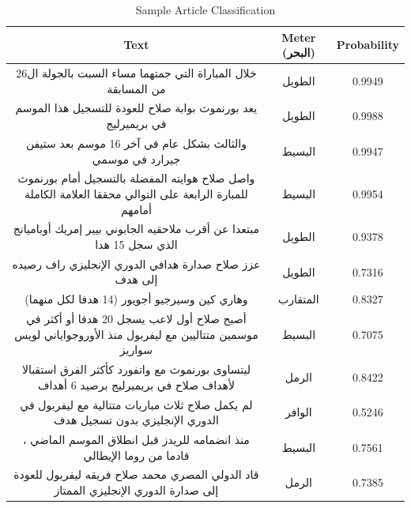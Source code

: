   \begin{table}[!t]
    \centering
    \begin{tabular*}{\textwidth}{c @{\extracolsep{\fill}}c c}
      \toprule
      \textbf{\small{Text}} & \small{\textbf{Meter (\textarabic{البحر})}} & \small{\textbf{Probability}} \\
      \midrule
            \textarabic{خلال المباراة التي جمتهما مساء السبت بالجولة ال26 من المسابقة} & \textarabic{الطويل} & 0.9949\\

      \textarabic{يعد بورنموث بوابة صلاح للعودة للتسجيل هذا الموسم في بريميرليج} & \textarabic{الطويل} & 0.9988\\
      
      \textarabic{والثالث بشكل عام في آخر 16 موسم بعد ستيفن جيرارد في موسمي} & \textarabic{البسيط} & 0.9947\\
      \textarabic{واصل صلاح هوايته المفضلة بالتسجيل أمام بورنموث للمبارة الرابعة على التوالي محققا العلامة الكاملة أمامهم} & \textarabic{البسيط} & 0.9954\\
            \textarabic{مبتعدا عن أقرب ملاحقيه الجابوني بيير إمريك أوباميانج الذي سجل 15 هدا} & \textarabic{الطويل} & 0.9378\\

      \textarabic{عزز صلاح صدارة هدافي الدوري الإنجليزي راف رصيده إلى  هدف} & \textarabic{الطويل} & 0.7316\\
      \textarabic{وهاري كين وسيرجيو أجويور (14 هدفا لكل منهما)} & \textarabic{المتقارب} & 0.8327\\
      \textarabic{أصبح صلاح أول لاعب يسجل 20 هدفا أو أكثر في موسمين متتاليين مع ليفربول منذ الأوروجواياني لويس سواريز} & \textarabic{البسيط} &0.7075\\
      \textarabic{ليتساوى بورنموث مع واتفورد كأكثر الفرق استقبالا لأهداف صلاح في بريميرليج برصيد 6 أهداف
} & \textarabic{الرمل} & 0.8422\\
      \textarabic{لم يكمل صلاح ثلاث مباريات متتالية مع ليفربول في الدوري الإنجليزي بدون تسجيل هدف} & \textarabic{الوافر} & 0.5246\\

      \textarabic{، منذ انضمامه للريدز قبل انطلاق الموسم الماضي قادما من روما الإيطالي} & \textarabic{البسيط} & 0.7561\\
      
\textarabic{قاد الدولي المصري محمد صلاح فريقه ليفربول للعودة إلى صدارة الدوري الإنجليزي الممتاز} & \textarabic{الرمل} & 0.7385\\
      \bottomrule
    \end{tabular*}
    \caption{Sample Article Classification }\label{Tab:Results_Article}
  \end{table}


